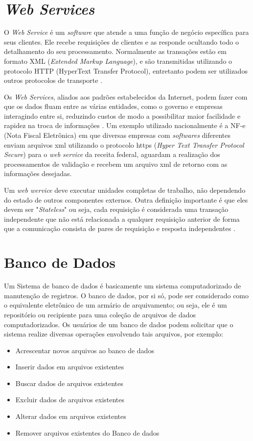 \section{\textit{Web Services}}\label{sec:WebServices}


O \textit{Web Service} é um \textit{software}  que atende a uma função de negócio específica para seus clientes. Ele recebe requisições de clientes e as responde ocultando todo o detalhamento do seu processamento. Normalmente as transações estão em formato XML (\textit{Extended Markup Language}), e são transmitidas utilizando o protocolo HTTP (HyperText Transfer Protocol), entretanto podem ser utilizados outros protocolos de transporte \cite{Sampaio:2003}.

Os \textit{Web Services}, aliados aos padrões estabelecidos da Internet, podem fazer com que os dados fluam entre as várias entidades, como o governo e empresas interagindo entre si, reduzindo custos de modo a possibilitar maior facilidade e rapidez na troca de informações \cite{Abinader:2006}. Um exemplo utilizado nacionalmente é a NF-e (Nota Fiscal Eletrônica) em que diversas empresas com \textit{softwares} diferentes enviam arquivos xml utilizando o protocolo https (\textit{Hyper Text Transfer Protocol Secure}) para o \textit{web service} da receita federal, aguardam a realização dos processamentos de validação e recebem um arquivo xml de retorno com as informações desejadas.

Um \textit{web wervice} deve executar unidades completas de trabalho, não dependendo do estado de outros componentes externos. Outra definição importante é que eles devem ser "\textit{Stateless}" ou seja, cada requisição é considerada uma transação independente que não está relacionada a qualquer requisição anterior de forma que a comunicação consista de pares de requisição e resposta independentes \cite{Sampaio:2003, W3C:2001}.


\section{Banco de Dados} \label{sec:BancodeDados}

Um Sistema de banco de dados é basicamente um sistema computadorizado de manutenção de registros. O banco de dados, por si só, pode ser considerado como o equivalente eletrônico de um armário de arquivamento; ou seja, ele é um repositório ou recipiente para uma coleção de arquivos de dados computadorizados. Os usuários de um banco de dados podem solicitar que o sistema realize diversas operações envolvendo tais arquivos, por exemplo:
\begin{itemize}
		\item Acrescentar novos arquivos ao banco de dados
		\item Inserir dados em arquivos existentes 
		\item Buscar dados de arquivos existentes
		\item Excluir dados de arquivos existentes
		\item Alterar dados em arquivos existentes
		\item Remover arquivos existentes do Banco de dados
\end{itemize}

